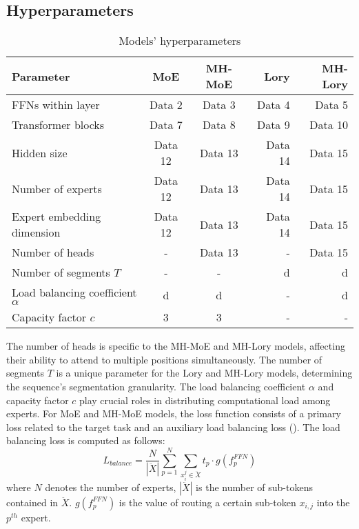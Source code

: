 \documentclass[12pt]{article}
\begin{document}
\subsection{Hyperparameters}

\begin{table}[h!]
\centering
\begin{tabular}{|l|c|c|r|r|}
\hline
Parameter & \textbf{MoE} & \textbf{MH-MoE} & \textbf{Lory} & \textbf{MH-Lory} \\
\hline
FFNs within layer & Data 2 & Data 3 & Data 4 & Data 5 \\
Transformer blocks & Data 7 & Data 8 & Data 9 & Data 10 \\
Hidden size  & Data 12 & Data 13 & Data 14 & Data 15 \\
Number of experts& Data 12 & Data 13 & Data 14 & Data 15 \\
Expert embedding dimension& Data 12 & Data 13 & Data 14 & Data 15 \\
\hline
Number of heads & - & Data 13 & - & Data 15 \\
Number of segments $T$ & - & - & d & d \\
Load balancing coefficient $\alpha$ & d & d & - & d \\
Capacity factor $c$ & 3 & 3 & - & - \\
\hline
\end{tabular}
\caption{Models' hyperparameters}
\label{tab:hyperparams_table}
\end{table}
The number of heads is specific to the MH-MoE and MH-Lory models, affecting their ability to attend to multiple positions simultaneously. The number of segments $T$ is a unique parameter for the Lory and MH-Lory models, determining the sequence's segmentation granularity. 
The load balancing coefficient $\alpha$ and capacity factor $c$ play crucial roles in distributing computational load among experts. 
For MoE and MH-MoE models, the loss function consists of a primary loss related to the target task and an auxiliary load balancing loss (\cite{wu2024multihead}). The load balancing loss is computed as follows:
\[ L_{balance} = \frac{N}{|\ddot{X}|} \sum_{p=1}^{N} \sum_{x_i^j \in \ddot{X}} t_p \cdot g(f_p^{FFN}) \]
where $N$ denotes the number of experts, $|\ddot{X}|$ is the number of sub-tokens contained in $\ddot{X}$. $g(f_p^{FFN})$ is the value of routing a certain sub-token $x_{i,j}$ into the $p^{th}$ expert.

 
\end{document}
